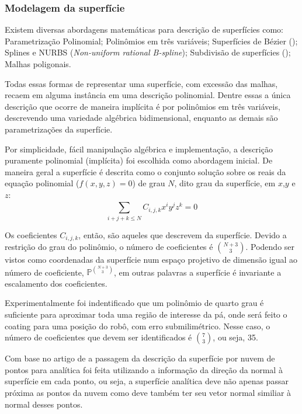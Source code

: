 \subsubsection{Modelagem da superfície}\label{modelagem}

Existem diversas abordagens matemáticas para descrição de superfícies como:
Parametrização Polinomial; Polinômios em três variáveis; Superfícies de
Bézier (\cite{farin2002curves}); Splines e NURBS (\textit{Non-uniform
rational B-spline}); Subdivisão de superfícies (\cite{peters2008subdivision}); Malhas
poligonais.

Todas essas formas de representar uma superfície, com excessão das malhas,
recaem em alguma instância em uma descrição polinomial. Dentre essas a única
descrição que ocorre de maneira implícita é por polinômios em três variáveis,
descrevendo uma variedade algébrica bidimensional, enquanto as demais são
parametrizações da superfície. 

Por simplicidade, fácil manipulação algébrica e implementação, a descrição
puramente polinomial (implícita) foi escolhida como abordagem inicial. De
maneira geral a superfície é descrita como o conjunto solução sobre os
reais da equação polinomial ($f(x,y,z)=0$) de grau $N$, dito grau da
superfície, em $x$,$y$ e $z$:
\[\sum\limits_{i+j+k \leq N}^{} C_{i,j,k}x^iy^jz^k = 0\]

Os coeficientes $C_{i,j,k}$, então, são aqueles que descrevem da superfície.
Devido a restrição do grau do polinômio, o número de coeficientes é
$\binom{N+3}{3}$. Podendo ser vistos como coordenadas da superfície num espaço
projetivo de dimensão igual ao número de coeficiente,
$\mathbb{P}^{\binom{N+3}{3}}$, em outras palavras a superfície é invariante a
escalamento dos coeficientes.

Experimentalmente foi indentificado que um polinômio de quarto grau é suficiente
para aproximar toda uma região de interesse da pá, onde será feito o coating
para uma posição do robô, com erro submilimétrico. Nesse caso, o número de
coeficientes que devem ser identificados é $\binom{7}{3}$, ou seja, 35.

Com base no artigo de \cite{juttler2002least} a passagem da descrição da
superfície por nuvem de pontos para analítica foi feita utilizando a informação da direção da normal à
superfície em cada ponto, ou seja, a superfície analítica deve não apenas passar
próxima as pontos da nuvem como deve também ter seu vetor normal similiar à
normal desses pontos.

